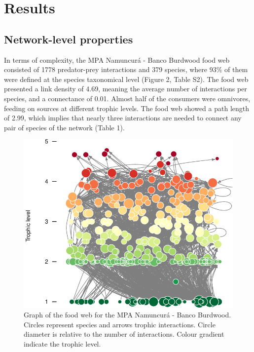 \documentclass[preprint, 3p,
authoryear]{elsarticle} %
\begin{document}
\hypertarget{results}{%
\section{Results}\label{results}}

\hypertarget{network-level-properties}{%
\subsection{Network-level properties}\label{network-level-properties}}

In terms of complexity, the MPA Namuncurá - Banco Burdwood food web
consisted of 1778 predator-prey interactions and 379 species, where 93\%
of them were defined at the species taxonomical level (Figure 2, Table
S2). The food web presented a link density of 4.69, meaning the average
number of interactions per species, and a connectance of 0.01. Almost
half of the consumers were omnivores, feeding on sources at different
trophic levels. The food web showed a path length of 2.99, which implies
that nearly three interactions are needed to connect any pair of species
of the network (Table 1).

\newpage

\begin{figure}

{\centering \includegraphics{MS_Burdwood_foodweb_files/figure-latex/figure2-1} 

}

\caption{Graph of the food web for the MPA Namuncurá - Banco Burdwood. Circles represent species and arrows trophic interactions. Circle diameter is relative to the number of interactions. Colour gradient indicate the trophic level.}\label{fig:figure2}
\end{figure}
\end{document}
